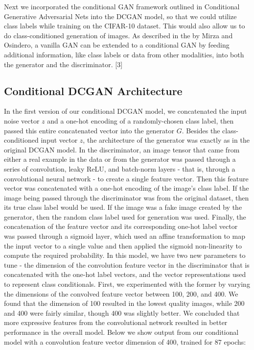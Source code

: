 \documentclass[a4paper]{article}
\begin{document}
Next we incorporated the conditional GAN framework outlined in Conditional Generative Adversarial Nets into the DCGAN model, so that we could utilize class labels while training on the CIFAR-10 dataset. This would also allow us to do class-conditioned generation of images. As described in the by Mirza and Osindero, a vanilla GAN can be extended to a conditional GAN by feeding additional information, like class labels or data from other modalities, into both the generator and the discriminator. [3]
\newline
\subsection*{Conditional DCGAN Architecture}
In the first version of our conditional DCGAN model, we concatenated the input noise vector $z$ and a one-hot encoding of a randomly-chosen class label, then passed this entire concatenated vector into the generator $G$. Besides the class-conditioned input vector $z$, the architecture of the generator was exactly as in the original DCGAN model. 
\newline
\newline
In the discriminator, an image tensor that came from either a real example in the data or from the generator was passed through a series of convolution, leaky ReLU, and batch-norm layers - that is, through a convolutional neural network - to create a single feature vector. Then this feature vector was concatenated with a one-hot encoding of the image's class label. If the image being passed through the discriminator was from the original dataset, then its true class label would be used. If the image was a  fake image created by the generator, then the random class label used for generation was used. Finally, the concatenation of the feature vector and its corresponding one-hot label vector was passed through a sigmoid layer, which used an affine transformation to map the input vector to a single value and then applied the sigmoid non-linearity to compute the required probability. 
\newline
\newline
In this model, we have two new parameters to tune - the dimension of the convolution feature vector in the discriminator that is concatenated with the one-hot label vectors, and the vector representations used to represent class conditionals. First, we experimented with the former by varying the dimensions of the convolved feature vector between 100, 200, and 400. We found that the dimension of 100 resulted in the lowest quality images, while 200 and 400 were fairly similar, though 400 was slightly better. We concluded that more expressive features from the convolutional network resulted in better performance in the overall model. Below we show output from our conditional model with a convolution feature vector dimension of 400, trained for 87 epochs:
\end{document}
